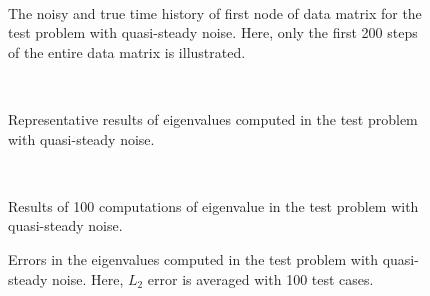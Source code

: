 \documentclass[aip,graphicx]{revtex4-1}
\begin{document}
\begin{figure}
	\\
	\caption{The noisy and true time history of first node of data matrix for the test problem with quasi-steady noise. Here, only the first 200 steps of the entire data matrix is illustrated. }
	\label{fig:steadyhist}
\end{figure}


\begin{figure}
	\\
	\caption{Representative results of eigenvalues computed in the test problem with quasi-steady noise. }
	\label{fig:steadyeigenexam}
\end{figure}

\begin{figure}
	\\
    \caption{Results of 100 computations of eigenvalue in the test problem with quasi-steady noise.}	
	\label{fig:steadyeigen}
\end{figure}

\begin{figure}
   \caption{Errors in the eigenvalues computed in the test problem with quasi-steady noise. Here, $L_2$ error is averaged with 100 test cases. }	
   \label{fig:steadyeigenerror}
\end{figure}
\end{document}
